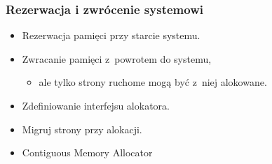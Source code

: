 \begin{frame}
  \frametitle{Rezerwacja i zwrócenie systemowi}

  \begin{itemize}
  \item Rezerwacja pamięci przy starcie systemu.
  \item Zwracanie pamięci z~powrotem do systemu,
    \begin{itemize}
    \item ale tylko strony ruchome mogą być z~niej alokowane.
    \end{itemize}
  \item Zdefiniowanie interfejsu alokatora.
  \item Migruj strony przy alokacji.
  \end{itemize}

  \begin{itemize}
  \item Contiguous Memory Allocator
  \end{itemize}
\end{frame}
